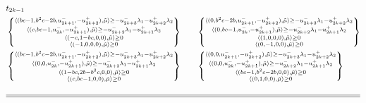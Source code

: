 \documentclass{amsart}
\numberwithin{theorem}{section}
\begin{document}
\begin{align*}
    &t_{2k-1}\\
    &\left\{\substack{
      \langle(bc-1,b^2c-2b,u^-_{2k+1},-u^+_{2k+2}),\tilde\mu\rangle\ge -u^-_{2k+3}\lambda_1-u^+_{2k+2}\lambda_2\\
      \langle(c,bc-1,u^-_{2k},-u^+_{2k+1}),\tilde\mu\rangle\ge -u^-_{2k+2}\lambda_1-u^+_{2k+1}\lambda_2\\
      \langle(-c,1-bc,0,0),\tilde\mu\rangle\ge 0\\
      \langle(-1,0,0,0),\tilde\mu\rangle\ge 0\\
    }\right\}
    \qquad\left\{\substack{
      \langle(0,b^2c-2b,u^-_{2k+1},-u^+_{2k+2}),\tilde\mu\rangle\ge -u^-_{2k+3}\lambda_1-u^+_{2k+2}\lambda_2\\
      \langle(0,bc-1,u^-_{2k},-u^+_{2k+1}),\tilde\mu\rangle\ge -u^-_{2k+2}\lambda_1-u^+_{2k+1}\lambda_2\\
      \langle(1,0,0,0),\tilde\mu\rangle\ge 0\\
      \langle(0,-1,0,0),\tilde\mu\rangle\ge 0
    }\right\}\\
    &\left\{\substack{
      \langle(bc-1,b^2c-2b,u^-_{2k+1},-u^+_{2k+2}),\tilde\mu\rangle\ge -u^-_{2k+3}\lambda_1-u^+_{2k+2}\lambda_2\\
      \langle(0,0,u^-_{2k},-u^+_{2k+1}),\tilde\mu\rangle\ge -u^-_{2k+2}\lambda_1-u^+_{2k+1}\lambda_2\\
      \langle(1-bc,2b-b^2c,0,0),\tilde\mu\rangle\ge 0\\
      \langle(c,bc-1,0,0),\tilde\mu\rangle\ge 0
    }\right\}
    \qquad\left\{\substack{
      \langle(0,0,u^-_{2k+1},-u^+_{2k+2}),\tilde\mu\rangle\ge -u^-_{2k+3}\lambda_1-u^+_{2k+2}\lambda_2\\
      \langle(0,0,u^-_{2k},-u^+_{2k+1}),\tilde\mu\rangle\ge -u^-_{2k+2}\lambda_1-u^+_{2k+1}\lambda_2\\
      \langle(bc-1,b^2c-2b,0,0),\tilde\mu\rangle\ge 0\\
      \langle(0,1,0,0),\tilde\mu\rangle\ge 0
    }\right\}\\
    \\\hline\hline\\
  \end{align*}

  
\end{document}

